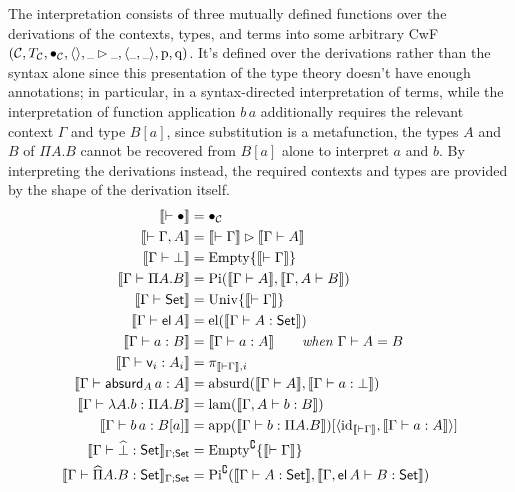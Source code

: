 \documentclass{article}
\renewcommand{\_}{\textrm{\textscale{.5}{\textunderscore}}}
\DeclarePairedDelimiter{\ctxt}{\langle}{\rangle}
\DeclarePairedDelimiter{\set}{\{}{\}}
\DeclarePairedDelimiter{\interp}{\llbracket}{\rrbracket}
\newcommand{\id}{\mathrm{id}}
\newcommand{\p}{\mathrm{p}}
\newcommand{\q}{\mathrm{q}}
\newcommand{\Empty}{\mathrm{Empty}}
\newcommand{\Absurd}{\mathrm{absurd}}
\newcommand{\pitype}{\mathrm{Pi}}
\newcommand{\lam}{\mathrm{lam}}
\newcommand{\app}{\mathrm{app}}
\newcommand{\univ}{\mathrm{Univ}}
\newcommand{\El}{\mathrm{el}}
\newcommand{\Set}{\mathsf{Set}}
\newcommand{\var}[1]{\mathsf{v}_{#1}}
\newcommand{\absurd}[2]{\mathsf{absurd}_{#1}\,#2}
\newcommand{\el}[1]{\mathsf{el}\,#1}
\newcommand{\code}[1]{#1^{\complement}}
\theoremstyle{definition}
\theoremstyle{plain}
\begin{document}
The interpretation consists of three mutually defined functions over the derivations of the contexts, types, and terms into some arbitrary CwF
$(\mathcal{C}, T_{\mathcal{C}}, \bullet_{\mathcal{C}}, \ctxt{}, \_\rhd\_, \ctxt{\_,\_}, \p, \q)$.
It's defined over the derivations rather than the syntax alone since this presentation of the type theory doesn't have enough annotations;
in particular, in a syntax-directed interpretation of terms,
while the interpretation of function application $b\,a$ additionally requires the relevant context $\Gamma$ and type $B[a]$,
since substitution is a metafunction, the types $A$ and $B$ of $\Pi A.B$ cannot be recovered from $B[a]$ alone
to interpret $a$ and $b$.
By interpreting the derivations instead,
the required contexts and types are provided by the shape of the derivation itself.
%
\begin{align*}
\interp{\vdash \bullet} &= \bullet_{\mathcal{C}} \\
\interp{\vdash \Gamma, A} &= \interp{\vdash \Gamma} \rhd \interp{\Gamma \vdash A} \\
\interp{\Gamma \vdash \bot} &= \Empty\set{\interp{\vdash \Gamma}} \\
\interp{\Gamma \vdash \Pi A.B} &= \pitype(\interp{\Gamma \vdash A}, \interp{\Gamma, A \vdash B}) \\
\interp{\Gamma \vdash \Set} &= \univ\set{\interp{\vdash \Gamma}} \\
\interp{\Gamma \vdash \el{A}} &= \El(\interp{\Gamma \vdash A : \Set}) \\
\interp{\Gamma \vdash a : B} &= \interp{\Gamma \vdash a : A} \qquad \textit{when $\Gamma \vdash A = B$} \\
\interp{\Gamma \vdash \var{i} : A_i} &= \pi_{\interp{\vdash \Gamma}, i} \\
\interp{\Gamma \vdash \absurd{A}{a} : A} &= \Absurd(\interp{\Gamma \vdash A}, \interp{\Gamma \vdash a : \bot}) \\
\interp{\Gamma \vdash \lambda A.b : \Pi A.B} &= \lam(\interp{\Gamma, A \vdash b : B}) \\
\interp{\Gamma \vdash b\,a : B[a]} &= \app(\interp{\Gamma \vdash b : \Pi A.B})[\ctxt{\id_{\interp{\vdash \Gamma}}, \interp{\Gamma \vdash a : A}}] \\
\interp{\Gamma \vdash \widehat{\bot} : \Set}_{\Gamma; \Set} &= \code{\Empty}\set{\interp{\vdash \Gamma}} \\
\interp{\Gamma \vdash \widehat{\Pi} A.B : \Set}_{\Gamma; \Set} &= \code{\pitype}(\interp{\Gamma \vdash A : \Set}, \interp{\Gamma, \el{A} \vdash B : \Set})
\end{align*}
\end{document}
